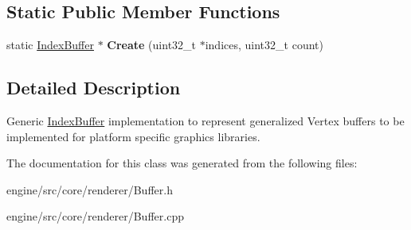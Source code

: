 \subsection*{Static Public Member Functions}
\begin{DoxyCompactItemize}
\item
\mbox{\label{classengine_1_1renderer_1_1IndexBuffer_a745efbbda6626a5dd4dd99d78018fe59}}
static \hyperlink{classengine_1_1renderer_1_1IndexBuffer}{Index\+Buffer} $\ast$ {\bfseries Create} (uint32\+\_\+t $\ast$indices, uint32\+\_\+t count)
\end{DoxyCompactItemize}


\subsection{Detailed Description}
Generic \hyperlink{classengine_1_1renderer_1_1IndexBuffer}{Index\+Buffer} implementation to represent generalized Vertex buffers to be implemented for platform specific graphics libraries.

The documentation for this class was generated from the following files\+:\begin{DoxyCompactItemize}
\item
engine/src/core/renderer/Buffer.\+h\item
engine/src/core/renderer/Buffer.\+cpp\end{DoxyCompactItemize}
